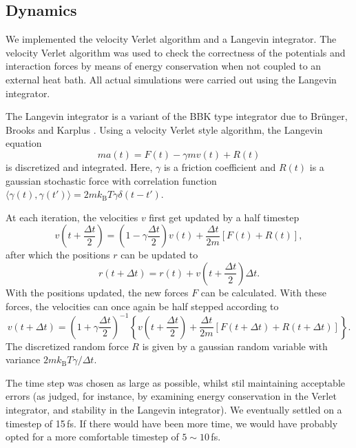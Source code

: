 \subsection{Dynamics}
We implemented the velocity Verlet algorithm and a Langevin integrator. The velocity Verlet algorithm was used to check the correctness of the potentials and interaction forces by means of energy conservation when not coupled to an external heat bath. All actual simulations were carried out using the Langevin integrator.

The Langevin integrator is a variant of the BBK type integrator due to Br{\"u}nger, Brooks and Karplus \cite{brunger1984stochastic}. Using a velocity Verlet style algorithm, the Langevin equation
\begin{equation}
m a(t) = F(t) - \gamma m v(t) + R(t)
\end{equation}
is discretized and integrated. Here, $\gamma$ is a friction coefficient and $R(t)$ is a gaussian stochastic force with correlation function $\langle\gamma(t), \gamma(t')\rangle = 2 m k_\text{B} T \gamma \delta(t-t')$.

At each iteration, the velocities $v$ first get updated by a half timestep
\begin{equation}
v\left(t + \frac{\Delta t}{2}\right)
= \left(1 - \gamma\frac{\Delta t}{2}\right) v(t)
	+ \frac{\Delta t}{2m} [F(t) + R(t)],
\end{equation}
after which the positions $r$ can be updated to
\begin{equation}
r(t + \Delta t)
= r(t) + v\left(t + \frac{\Delta t}{2}\right) \Delta t.
\end{equation}
With the positions updated, the new forces $F$ can be calculated. With these forces, the velocities can once again be half stepped according to
\begin{equation}
v(t + \Delta t) = \left(1 + \gamma \frac{\Delta t}{2}\right)^{-1}
\left\{
	v\left(t + \frac{\Delta t}{2}\right)
	+ \frac{\Delta t}{2m} \left[
			F(t + \Delta t) + R(t + \Delta t)
	\right]
\right\}.
\end{equation}
The discretized random force $R$ is given by a gaussian random variable with variance $2 m k_\text{B} T \gamma / \Delta t$.

The time step was chosen as large as possible, whilst stil maintaining acceptable errors (as judged, for instance, by examining energy conservation in the Verlet integrator, and stability in the Langevin integrator).
We eventually settled on a timestep of 15\,fs. If there would have been more time, we would have probably opted for a more comfortable timestep of $5\sim10$\,fs.


